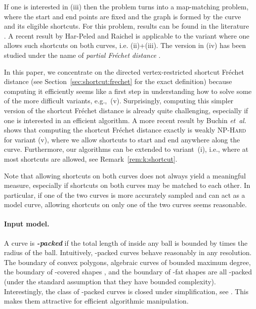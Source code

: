 \documentclass[12pt]{article}
\providecommand{\ComplexityClass}[1]{{{\textcolor[named]{OliveGreen}{\textsc{#1}}}}}
\providecommand{\NPHard}{{\ComplexityClass{NP-Hard}}\index{NP!hard}\xspace}
\newcommand{\secref}[1]{Section~\ref{sec:#1}}
\newcommand{\remrefpage}[1]{Remark~\ref{rem:#1}}
\newcommand{\figlab}[1]{\label{fig:#1}}
\newcommand{\etal}{\textit{et~al.}\xspace}
\newcommand{\emphic}[2]{\textcolor{blue25}{\textbf{\emph{#1}}}\index{#2}}
\newcommand{\emphi}[1]{\emphic{#1}{#1}}
\newcommand{\Frechet}{Fr\'{e}c{h}e{}t\xspace}\providecommand{\Arr}{\mathop{\mathrm{\EuScript{A}}}}
\newcommand{\AlphaBetaCovered}{-covered\xspace}
\numberwithin{figure}{section}
\numberwithin{equation}{section}
\newcommand{\vrestricted}{vertex-restricted}
\newcommand{\asymmetric}{directed}
\begin{document}
\parpic[r]{\begin{minipage}{0.25\linewidth}\texttt{[image: figs/hiking]}
       \figlab{shortcut:example}\end{minipage}}


If one is interested in (iii) then the problem turns into a
map-matching problem, where the start and end points are fixed and the
graph is formed by the curve and its eligible shortcuts. For this
problem, results can be found in the literature \cite{cdgnw-amm-11,
   aerw-mpm-03}. A recent result by Har-Peled and Raichel
\cite{hr-fdre-11} is applicable to the variant where one allows such
shortcuts on both curves, i.e. (ii)+(iii).  The version in (iv) has
been studied under the name of \emph{partial \Frechet distance}
\cite{bbw-eapcm-09}.

In this paper, we concentrate on the \asymmetric{} \vrestricted{}
shortcut \Frechet distance (see \secref{shortcut:frechet} for the
exact definition) because computing it efficiently seems like a first
step in understanding how to solve some of the more difficult
variants, e.g.,~(v).  Surprisingly, computing this simpler version of
the shortcut \Frechet distance is already quite challenging,
especially if one is interested in an efficient algorithm.  A more
recent result by Buchin \etal~\cite{bds-jnp-13, d-raapg-13} shows that
computing the shortcut \Frechet distance exactly is weakly \NPHard for
variant (v), where we allow shortcuts to start and end anywhere along
the curve.  Furthermore, our algorithms can be extended to
variant~(i), i.e., where at most  shortcuts are allowed, see
\remrefpage{k:shortcut}.

Note that allowing shortcuts on both curves does not always yield a
meaningful measure, {especially if shortcuts on both curves may be
   matched to each other.  In particular, if one of the two curves is
   more accurately sampled and can act as a model curve, allowing
   shortcuts on only one of the two curves seems reasonable. }



\paragraph{Input model.} 
A curve  is \emphi{-packed} if the total length of 
inside any ball is bounded by  times the radius of the ball.
Intuitively, -packed curves behave reasonably in any resolution.
The boundary of convex polygons, algebraic curves of bounded maximum
degree, the boundary of \AlphaBetaCovered shapes \cite{e-cuabc-05},
and the boundary of -fat shapes \cite{d-ibucf-08} are all
-packed (under the standard assumption that they have bounded
complexity).  Interestingly, the class of -packed curves is closed
under simplification, see \cite{dhw-afdrc-12}. This makes them
attractive for efficient algorithmic manipulation.
\end{document}
